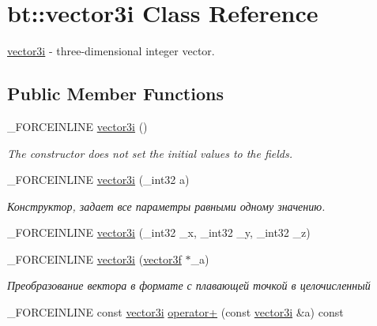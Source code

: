 \hypertarget{classbt_1_1vector3i}{\section{bt\-:\-:vector3i Class Reference}
\label{classbt_1_1vector3i}
}


\hyperlink{classbt_1_1vector3i}{vector3i} -\/ three-\/dimensional integer vector.  


\subsection*{Public Member Functions}
\begin{DoxyCompactItemize}
\item 
\hypertarget{classbt_1_1vector3i_a519c2ff9e15ef53c9f4bdc3943ee55cc}{\-\_\-\-F\-O\-R\-C\-E\-I\-N\-L\-I\-N\-E \hyperlink{classbt_1_1vector3i_a519c2ff9e15ef53c9f4bdc3943ee55cc}{vector3i} ()}\label{classbt_1_1vector3i_a519c2ff9e15ef53c9f4bdc3943ee55cc}

\begin{DoxyCompactList}\small\item\em The constructor does not set the initial values to the fields. \end{DoxyCompactList}\item 
\hypertarget{classbt_1_1vector3i_aa0ec95430d8d12b0f0fa2185591ead6a}{\-\_\-\-F\-O\-R\-C\-E\-I\-N\-L\-I\-N\-E \hyperlink{classbt_1_1vector3i_aa0ec95430d8d12b0f0fa2185591ead6a}{vector3i} (\-\_\-int32 a)}\label{classbt_1_1vector3i_aa0ec95430d8d12b0f0fa2185591ead6a}

\begin{DoxyCompactList}\small\item\em Конструктор, задает все параметры равными одному значению. \end{DoxyCompactList}\item 
\-\_\-\-F\-O\-R\-C\-E\-I\-N\-L\-I\-N\-E \hyperlink{classbt_1_1vector3i_a9fd22d7195491b7f20ccb86439f1cfd2}{vector3i} (\-\_\-int32 \-\_\-x, \-\_\-int32 \-\_\-y, \-\_\-int32 \-\_\-z)
\item 
\hypertarget{classbt_1_1vector3i_a12870d26e9ecd02051c65b7fa31c133b}{\-\_\-\-F\-O\-R\-C\-E\-I\-N\-L\-I\-N\-E \hyperlink{classbt_1_1vector3i_a12870d26e9ecd02051c65b7fa31c133b}{vector3i} (\hyperlink{classbt_1_1vector3f}{vector3f} $\ast$\-\_\-a)}\label{classbt_1_1vector3i_a12870d26e9ecd02051c65b7fa31c133b}

\begin{DoxyCompactList}\small\item\em Преобразование вектора в формате с плавающей точкой в целочисленный \end{DoxyCompactList}\item 
\hypertarget{classbt_1_1vector3i_a2eb56d6086cffd75cd8466bf20b87b64}{\-\_\-\-F\-O\-R\-C\-E\-I\-N\-L\-I\-N\-E const \hyperlink{classbt_1_1vector3i}{vector3i} \hyperlink{classbt_1_1vector3i_a2eb56d6086cffd75cd8466bf20b87b64}{operator+} (const \hyperlink{classbt_1_1vector3i}{vector3i} \&a) const }\label{classbt_1_1vector3i_a2eb56d6086cffd75cd8466bf20b87b64}


\end{DoxyCompactItemize}
